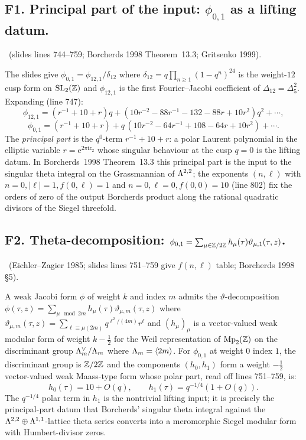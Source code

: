 \subsection*{F1. Principal part of the input: $\phi_{0,1}$ as a lifting datum.}
\ClaimStatusTheorem\ (slides lines 744--759; Borcherds 1998 Theorem~13.3;
Gritsenko 1999).

The slides give $\phi_{0,1}=\phi_{12,1}/\delta_{12}$ where
$\delta_{12}=q\prod_{n\geq 1}(1-q^n)^{24}$ is the weight-$12$ cusp form on
$\mathrm{SL}_2(\mathbb{Z})$ and $\phi_{12,1}$ is the first Fourier--Jacobi
coefficient of $\Delta_{12}=\Delta_5^2$. Expanding (line 747):
\[
\phi_{12,1} = (r^{-1} + 10 + r)q + (10r^{-2} - 88r^{-1} - 132 - 88r + 10r^2)q^2 + \cdots,
\]
\[
\phi_{0,1} = (r^{-1} + 10 + r) + q\,(10r^{-2} - 64r^{-1} + 108 - 64r + 10r^2) + \cdots.
\]
The \emph{principal part} is the $q^0$-term $r^{-1}+10+r$: a polar Laurent
polynomial in the elliptic variable $r=\mathrm{e}^{2\pi\mathrm{i} z_2}$ whose singular
behaviour at the cusp $q=0$ is the lifting datum. In Borcherds~1998
Theorem~13.3 this principal part is the input to the singular theta
integral on the Grassmannian of $\Lambda^{2,2}$; the exponents
$(n,\ell)$ with $n=0,|\ell|=1,f(0,\ell)=1$ and $n=0,\ell=0,f(0,0)=10$
(line 802) fix the orders of zero of the output Borcherds product
along the rational quadratic divisors of the Siegel threefold.

\subsection*{F2. Theta-decomposition: $\phi_{0,1}=\sum_{\mu\in\mathbb{Z}/2\mathbb{Z}}h_{\mu}(\tau)\vartheta_{\mu,1}(\tau,z)$.}
\ClaimStatusTheorem\ (Eichler--Zagier 1985; slides lines 751--759 give
$f(n,\ell)$ table; Borcherds 1998 \S 5).

A weak Jacobi form $\phi$ of weight $k$ and index $m$ admits the
$\vartheta$-decomposition $\phi(\tau,z)=\sum_{\mu\!\!\mod 2m}h_{\mu}(\tau)\vartheta_{\mu,m}(\tau,z)$
where $\vartheta_{\mu,m}(\tau,z)=\sum_{\ell\equiv\mu(2m)}q^{\ell^2/(4m)}r^{\ell}$ and
$(h_{\mu})_{\mu}$ is a vector-valued weak modular form of weight
$k-\tfrac12$ for the Weil representation of $\mathrm{Mp}_2(\mathbb{Z})$ on the
discriminant group $\Lambda_m^{\vee}/\Lambda_m$ where $\Lambda_m=\langle 2m\rangle$.
For $\phi_{0,1}$ at weight $0$ index $1$, the discriminant group is
$\mathbb{Z}/2\mathbb{Z}$ and the components $(h_0,h_1)$ form a weight $-\tfrac12$
vector-valued weak Maass-type form whose polar part, read off lines
751--759, is:
\[
h_0(\tau) = 10 + O(q),\qquad h_1(\tau) = q^{-1/4}(1 + O(q)).
\]
The $q^{-1/4}$ polar term in $h_1$ is the nontrivial lifting input; it
is precisely the principal-part datum that Borcherds' singular theta
integral against the $\Lambda^{2,2}\oplus\Lambda^{1,1}$-lattice theta series
converts into a meromorphic Siegel modular form with Humbert-divisor
zeros.

